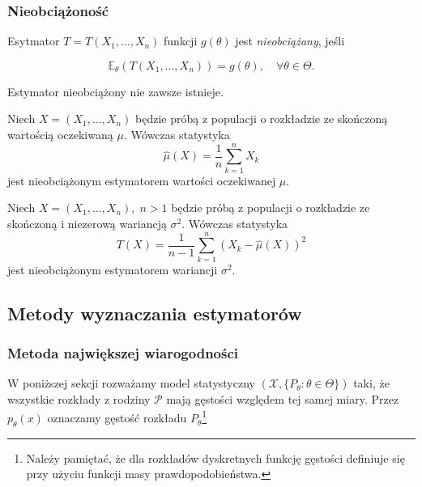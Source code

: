 \subsubsection{Nieobciążoność}
	\begin{df}
		Esytmator $T = T(X_1, \ldots, X_n)$ funkcji $g(\theta)$ jest \textit{nieobciążany}, jeśli
		
		\begin{equation*}
			\mathbb{E}_{\theta}(T(X_1, \ldots, X_n)) = g(\theta), \quad \forall \theta \in \Theta.
		\end{equation*}
	\end{df}
	\begin{uwg}
		Estymator nieobciążony nie zawsze istnieje.
	\end{uwg}
	
	\begin{przyk}
			Niech $X = (X_1, \ldots, X_n)$ będzie próbą z populacji o rozkładzie ze skończoną wartością oczekiwaną $\mu$. Wówczas statystyka 
			\begin{equation*}
				\hat{\mu}(X) = \frac{1}{n} \sum\limits_{k=1}^{n} X_k
			\end{equation*}
			jest nieobciążonym estymatorem wartości oczekiwanej $\mu$.
	\end{przyk}
	
	\begin{przyk}
			Niech $X = (X_1, \ldots, X_n), \; n >1$ będzie próbą z populacji o rozkładzie ze skończoną i niezerową wariancją $\sigma^2$. Wówczas statystyka
			\begin{equation*}
				T(X) = \frac{1}{n-1} \sum\limits_{k=1}^{n}(X_k - \hat{\mu}(X))^2
			\end{equation*}
			jest nieobciążonym estymatorem wariancji $\sigma^2$.
	\end{przyk}
	

\subsection{Metody wyznaczania estymatorów}
\subsubsection{Metoda największej wiarogodności}
	W poniższej sekcji rozważamy model statystyczny $(\mathcal{X},\{P_\theta \colon \theta \in \Theta\})$ taki, że wszystkie rozkłady z rodziny $\mathcal{P}$ mają gęstości względem tej samej miary. Przez $p_{\theta}(x)$ oznaczamy gęstość rozkładu $P_{\theta}$\footnote{Należy pamiętać, że dla rozkładów dyskretnych funkcję gęstości definiuje się przy użyciu funkcji masy prawdopodobieństwa.}


